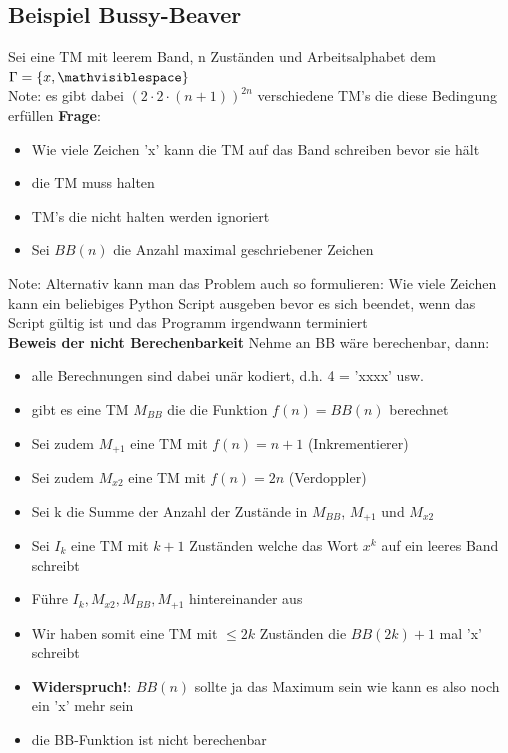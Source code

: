 \documentclass[12pt,a4paper]{article}
\begin{document}
\subsection{Beispiel Bussy-Beaver}

Sei eine TM mit leerem Band, n Zuständen und Arbeitsalphabet dem $\Gamma = \{x, \mathvisiblespace \}$\\
Note: es gibt dabei $(2\cdot 2\cdot (n+1))^{2n}$ verschiedene TM's die diese Bedingung erfüllen
\textbf{Frage}:
\begin{itemize}
\item Wie viele Zeichen 'x' kann die TM auf das Band schreiben bevor sie hält
\item die TM muss halten
\item TM's die nicht halten werden ignoriert
\item Sei $BB(n)$ die Anzahl maximal geschriebener Zeichen
\end{itemize}
Note: Alternativ kann man das Problem auch so formulieren: Wie viele Zeichen kann ein beliebiges Python Script ausgeben bevor es sich beendet, wenn das Script gültig ist und das Programm irgendwann terminiert\\
\textbf{Beweis der nicht Berechenbarkeit}
Nehme an BB wäre berechenbar, dann:
\begin{itemize}
\item alle Berechnungen sind dabei unär kodiert, d.h. 4 = 'xxxx' usw.
\item gibt es eine TM $M_{BB}$ die die Funktion $f(n) = BB(n)$ berechnet
\item Sei zudem $M_{+1}$ eine TM mit $f(n) = n+1$ (Inkrementierer)
\item Sei zudem $M_{x2}$ eine TM mit $f(n) = 2n$	(Verdoppler)
\item Sei k die Summe der Anzahl der Zustände in $M_{BB}$, $M_{+1}$ und $M_{x2}$ 
\item Sei $I_k$ eine TM mit $k+1$ Zuständen welche das Wort $x^k$ auf ein leeres Band schreibt
\item Führe $I_k, M_{x2}, M_{BB}, M_{+1}$ hintereinander aus
\item Wir haben somit eine TM mit $\leq 2k$ Zuständen die $BB(2k) +1$ mal 'x' schreibt
\item \textbf{Widerspruch!}: $BB(n)$ sollte ja das Maximum sein wie kann es also noch ein 'x' mehr sein
\item die BB-Funktion ist nicht berechenbar 
\end{itemize}
\end{document}
